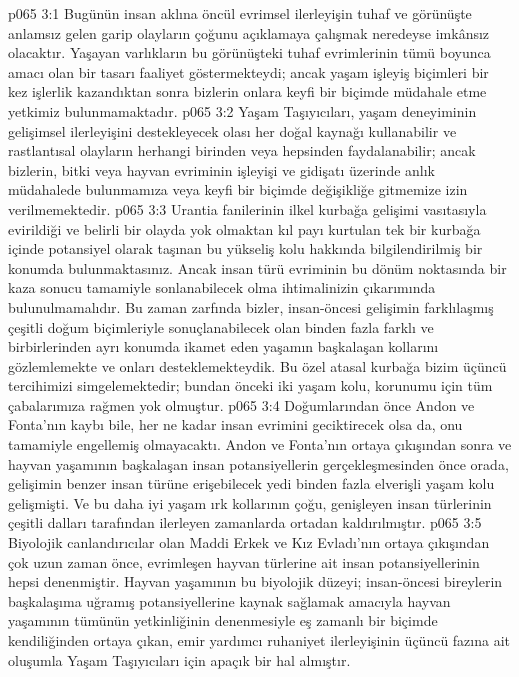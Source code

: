 \vs p065 3:1 Bugünün insan aklına öncül evrimsel ilerleyişin tuhaf ve görünüşte anlamsız gelen garip olayların çoğunu açıklamaya çalışmak neredeyse imkânsız olacaktır. Yaşayan varlıkların bu görünüşteki tuhaf evrimlerinin tümü boyunca amacı olan bir tasarı faaliyet göstermekteydi; ancak yaşam işleyiş biçimleri bir kez işlerlik kazandıktan sonra bizlerin onlara keyfi bir biçimde müdahale etme yetkimiz bulunmamaktadır.
\vs p065 3:2 Yaşam Taşıyıcıları, yaşam deneyiminin gelişimsel ilerleyişini destekleyecek olası her doğal kaynağı kullanabilir ve rastlantısal olayların herhangi birinden veya hepsinden faydalanabilir; ancak bizlerin, bitki veya hayvan evriminin işleyişi ve gidişatı üzerinde anlık müdahalede bulunmamıza veya keyfi bir biçimde değişikliğe gitmemize izin verilmemektedir.
\vs p065 3:3 Urantia fanilerinin ilkel kurbağa gelişimi vasıtasıyla evirildiği ve belirli bir olayda yok olmaktan kıl payı kurtulan tek bir kurbağa içinde potansiyel olarak taşınan bu yükseliş kolu hakkında bilgilendirilmiş bir konumda bulunmaktasınız. Ancak insan türü evriminin bu dönüm noktasında bir kaza sonucu tamamiyle sonlanabilecek olma ihtimalinizin çıkarımında bulunulmamalıdır. Bu zaman zarfında bizler, insan\hyp{}öncesi gelişimin farklılaşmış çeşitli doğum biçimleriyle sonuçlanabilecek olan binden fazla farklı ve birbirlerinden ayrı konumda ikamet eden yaşamın başkalaşan kollarını gözlemlemekte ve onları desteklemekteydik. Bu özel atasal kurbağa bizim üçüncü tercihimizi simgelemektedir; bundan önceki iki yaşam kolu, korunumu için tüm çabalarımıza rağmen yok olmuştur.
\vs p065 3:4 Doğumlarından önce Andon ve Fonta’nın kaybı bile, her ne kadar insan evrimini geciktirecek olsa da, onu tamamiyle engellemiş olmayacaktı. Andon ve Fonta’nın ortaya çıkışından sonra ve hayvan yaşamının başkalaşan insan potansiyellerin gerçekleşmesinden önce orada, gelişimin benzer insan türüne erişebilecek yedi binden fazla elverişli yaşam kolu gelişmişti. Ve bu daha iyi yaşam ırk kollarının çoğu, genişleyen insan türlerinin çeşitli dalları tarafından ilerleyen zamanlarda ortadan kaldırılmıştır.
\vs p065 3:5 Biyolojik canlandırıcılar olan Maddi Erkek ve Kız Evladı’nın ortaya çıkışından çok uzun zaman önce, evrimleşen hayvan türlerine ait insan potansiyellerinin hepsi denenmiştir. Hayvan yaşamının bu biyolojik düzeyi; insan\hyp{}öncesi bireylerin başkalaşıma uğramış potansiyellerine kaynak sağlamak amacıyla hayvan yaşamının tümünün yetkinliğinin denenmesiyle eş zamanlı bir biçimde kendiliğinden ortaya çıkan, emir yardımcı ruhaniyet ilerleyişinin üçüncü fazına ait oluşumla Yaşam Taşıyıcıları için apaçık bir hal almıştır.
